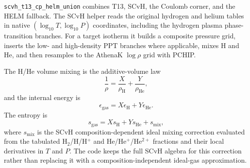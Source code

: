 \documentclass[11pt]{article}
\newcommand{\eps}{\epsilon}
\begin{document}
\texttt{scvh\_t13\_cp\_helm\_union} combines T13, SCvH, the Coulomb corner,
and the HELM fallback.  The SCvH helper reads the original hydrogen and helium
tables in native $(\log_{10}T,\log_{10}P)$ coordinates, including the hydrogen
plasma phase-transition branches.  For a target isotherm it builds a composite
pressure grid, inserts the low- and high-density PPT branches where applicable,
mixes H and He, and then resamples to the AthenaK $\log\rho$ grid with PCHIP.

The H/He volume mixing is the additive-volume law
\begin{equation}
  \frac{1}{\rho}=\frac{X}{\rho_{\mathrm H}}+\frac{Y}{\rho_{\mathrm{He}}},
\end{equation}
and the internal energy is
\begin{equation}
  \eps_{\mathrm{gas}}=X\eps_{\mathrm H}+Y\eps_{\mathrm{He}}.
\end{equation}
The entropy is
\begin{equation}
  s_{\mathrm{gas}}=Xs_{\mathrm H}+Ys_{\mathrm{He}}+s_{\mathrm{mix}},
\end{equation}
where $s_{\mathrm{mix}}$ is the SCvH composition-dependent ideal mixing
correction evaluated from the tabulated H$_2$/H/H$^+$ and
He/He$^+$/He$^{2+}$ fractions and their local derivatives in $T$ and $P$.
The code keeps the full SCvH algebra for this correction rather than replacing
it with a composition-independent ideal-gas approximation.
\end{document}
